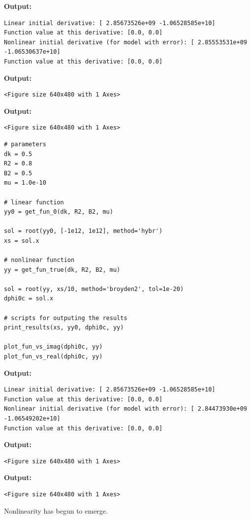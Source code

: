 \documentclass{article}
\begin{document}
\textbf{Output:}\begin{verbatim}
Linear initial derivative: [ 2.85673526e+09 -1.06528585e+10]
Function value at this derivative: [0.0, 0.0]
Nonlinear initial derivative (for model with error): [ 2.85553531e+09 -1.06530637e+10]
Function value at this derivative: [0.0, 0.0]

\end{verbatim}

\textbf{Output:}\begin{verbatim}
<Figure size 640x480 with 1 Axes>
\end{verbatim}

\textbf{Output:}\begin{verbatim}
<Figure size 640x480 with 1 Axes>
\end{verbatim}

\begin{lstlisting}
# parameters
dk = 0.5
R2 = 0.8
B2 = 0.5
mu = 1.0e-10

# linear function
yy0 = get_fun_0(dk, R2, B2, mu)

sol = root(yy0, [-1e12, 1e12], method='hybr')
xs = sol.x

# nonlinear function
yy = get_fun_true(dk, R2, B2, mu)

sol = root(yy, xs/10, method='broyden2', tol=1e-20)
dphi0c = sol.x

# scripts for outputing the results
print_results(xs, yy0, dphi0c, yy)

plot_fun_vs_imag(dphi0c, yy)
plot_fun_vs_real(dphi0c, yy)\end{lstlisting}

\textbf{Output:}\begin{verbatim}
Linear initial derivative: [ 2.85673526e+09 -1.06528585e+10]
Function value at this derivative: [0.0, 0.0]
Nonlinear initial derivative (for model with error): [ 2.84473930e+09 -1.06549202e+10]
Function value at this derivative: [0.0, 0.0]

\end{verbatim}

\textbf{Output:}\begin{verbatim}
<Figure size 640x480 with 1 Axes>
\end{verbatim}

\textbf{Output:}\begin{verbatim}
<Figure size 640x480 with 1 Axes>
\end{verbatim}

Nonlinearity has begun to emerge.
\end{document}
